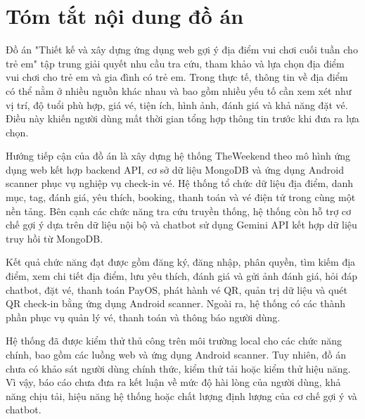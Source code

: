 \documentclass[../DoAn.tex]{subfiles}
\begin{document}
\chapter*{Tóm tắt nội dung đồ án}

Đồ án "Thiết kế và xây dựng ứng dụng web gợi ý địa điểm vui chơi cuối tuần cho trẻ em" tập trung giải quyết nhu cầu tra cứu, tham khảo và lựa chọn địa điểm vui chơi cho trẻ em và gia đình có trẻ em. Trong thực tế, thông tin về địa điểm có thể nằm ở nhiều nguồn khác nhau và bao gồm nhiều yếu tố cần xem xét như vị trí, độ tuổi phù hợp, giá vé, tiện ích, hình ảnh, đánh giá và khả năng đặt vé. Điều này khiến người dùng mất thời gian tổng hợp thông tin trước khi đưa ra lựa chọn.

Hướng tiếp cận của đồ án là xây dựng hệ thống TheWeekend theo mô hình ứng dụng web kết hợp backend API, cơ sở dữ liệu MongoDB và ứng dụng Android scanner phục vụ nghiệp vụ check-in vé. Hệ thống tổ chức dữ liệu địa điểm, danh mục, tag, đánh giá, yêu thích, booking, thanh toán và vé điện tử trong cùng một nền tảng. Bên cạnh các chức năng tra cứu truyền thống, hệ thống còn hỗ trợ cơ chế gợi ý dựa trên dữ liệu nội bộ và chatbot sử dụng Gemini API kết hợp dữ liệu truy hồi từ MongoDB.

Kết quả chức năng đạt được gồm đăng ký, đăng nhập, phân quyền, tìm kiếm địa điểm, xem chi tiết địa điểm, lưu yêu thích, đánh giá và gửi ảnh đánh giá, hỏi đáp chatbot, đặt vé, thanh toán PayOS, phát hành vé QR, quản trị dữ liệu và quét QR check-in bằng ứng dụng Android scanner. Ngoài ra, hệ thống có các thành phần phục vụ quản lý vé, thanh toán và thông báo người dùng.

Hệ thống đã được kiểm thử thủ công trên môi trường local cho các chức năng chính, bao gồm các luồng web và ứng dụng Android scanner. Tuy nhiên, đồ án chưa có khảo sát người dùng chính thức, kiểm thử tải hoặc kiểm thử hiệu năng. Vì vậy, báo cáo chưa đưa ra kết luận về mức độ hài lòng của người dùng, khả năng chịu tải, hiệu năng hệ thống hoặc chất lượng định lượng của cơ chế gợi ý và chatbot.
\end{document}
